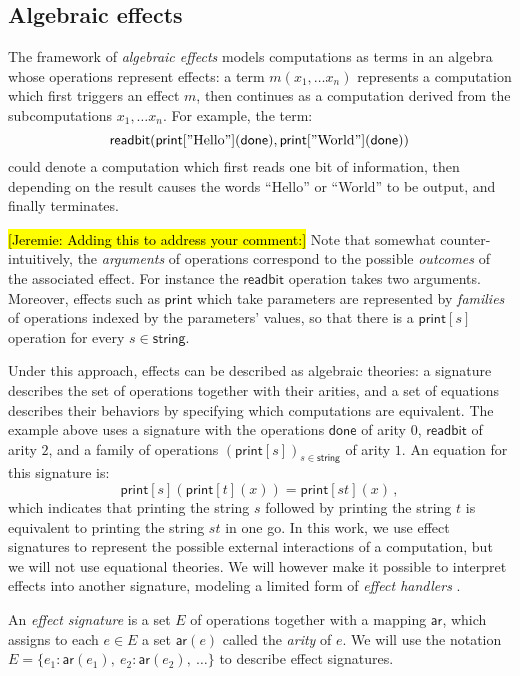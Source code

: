 \documentclass[sigplan,screen]{acmart}
\newcommand{\kw}[1]{\ensuremath{ \mathsf{#1} }}
\newcommand{\hlc}[2][yellow]{ {\sethlcolor{#1} \hl{#2}} }
\newcommand\jk[1]{\hlc[pink]{[Jeremie: #1]}}
\begin{document}
\subsection{Algebraic effects} \label{sec:bg:sig} %

The framework of \emph{algebraic effects}
models computations as terms in an algebra
whose operations represent effects:
a term $m(x_1, \ldots x_n)$
represents a computation which first
triggers an effect $m$,
then continues as a computation derived from
the subcomputations $x_1, \ldots x_n$.
For example,
the term:
\[
    \kw{readbit}(
      \kw{print}["\text{Hello}"](\kw{done}),
      \kw{print}["\text{World}"](\kw{done}))
\]
could denote a computation which
first reads one bit of information,
then depending on the result
causes the words ``Hello'' or ``World'' to be output,
and finally terminates.

\jk{Adding this to address your comment:}
Note that somewhat counter-intuitively,
the \emph{arguments} of operations correspond to
the possible \emph{outcomes} of the associated effect.
For instance the $\kw{readbit}$ operation takes two arguments.
Moreover,
effects such as $\kw{print}$
which take parameters
are represented by \emph{families}
of operations indexed by the parameters' values,
so that there is a $\kw{print}[s]$
operation for every $s \in \kw{string}$.

Under this approach,
effects can be described as algebraic theories:
a signature describes the set of operations together with their arities,
and a set of equations describes their behaviors
by specifying which computations are equivalent.
The example above uses a signature with the operations
$\kw{done}$ of arity $0$,
$\kw{readbit}$ of arity $2$,
and a family of operations $(\kw{print}[s])_{s \in \kw{string}}$
of arity $1$.
An equation for this signature is:
\[
    \kw{print}[s](\kw{print}[t](x)) =
    \kw{print}[st](x) \,,
\]
which indicates that
printing the string $s$ followed by
printing the string $t$ is equivalent to
printing the string $st$ in one go.
In this work,
we use effect signatures to represent
the possible external interactions
of a computation,
but we will not use equational theories.
We will however make it possible to interpret effects
into another signature,
modeling a limited form of
\emph{effect handlers} \cite{eff}.

\begin{definition} \label{def:esig}
An \emph{effect signature}
is a set $E$ of operations
together with a mapping $\kw{ar}$,
which assigns to each $e \in E$ a set $\kw{ar}(e)$
called the \emph{arity} of $e$.
We will use the notation
$E = \{ e_1 : \kw{ar}(e_1), \: e_2 : \kw{ar}(e_2), \: \ldots \}$
to describe effect signatures.
\end{definition}
\end{document}
